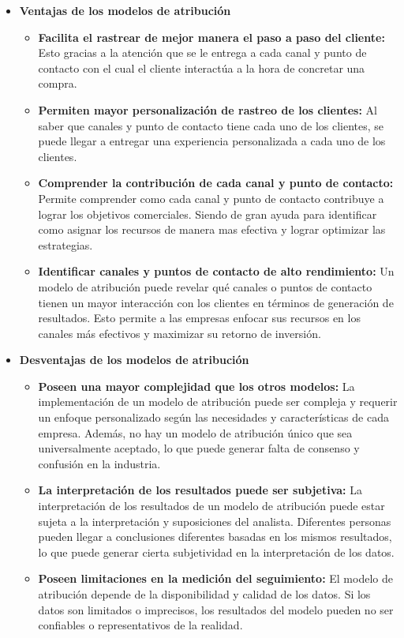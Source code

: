 \begin{itemize}
    \item \textbf{Ventajas de los modelos de atribución}
    \begin{itemize}
        \item \textbf{Facilita el rastrear de mejor manera el paso a paso del cliente:} Esto gracias a la atención que se le entrega a cada canal y punto de contacto con el cual el cliente interactúa a la hora de concretar una compra.
        \item \textbf{Permiten mayor personalización de rastreo de los clientes:} Al saber que canales y punto de contacto tiene cada uno de los clientes, se puede llegar a entregar una experiencia personalizada a cada uno de los clientes.
        \item \textbf{Comprender la contribución de cada canal y punto de contacto:} Permite comprender como cada canal y punto de contacto contribuye a lograr los objetivos comerciales. Siendo de gran ayuda para identificar como asignar los recursos de manera mas efectiva y lograr optimizar las estrategias.
        \item \textbf{Identificar canales y puntos de contacto de alto rendimiento:} Un modelo de atribución puede revelar qué canales o puntos de contacto tienen un mayor interacción con los clientes en términos de generación de resultados. Esto permite a las empresas enfocar sus recursos en los canales más efectivos y maximizar su retorno de inversión.
    \end{itemize}
    \item \textbf{Desventajas de los modelos de atribución}
    \begin{itemize}
    \item \textbf{Poseen una mayor complejidad que los otros modelos:} La implementación de un modelo de atribución puede ser compleja y requerir un enfoque personalizado según las necesidades y características de cada empresa. Además, no hay un modelo de atribución único que sea universalmente aceptado, lo que puede generar falta de consenso y confusión en la industria.
    \item \textbf{La interpretación de los resultados puede ser subjetiva:} La interpretación de los resultados de un modelo de atribución puede estar sujeta a la interpretación y suposiciones del analista. Diferentes personas pueden llegar a conclusiones diferentes basadas en los mismos resultados, lo que puede generar cierta subjetividad en la interpretación de los datos.
    \item \textbf{Poseen limitaciones en la medición del seguimiento:} El modelo de atribución depende de la disponibilidad y calidad de los datos. Si los datos son limitados o imprecisos, los resultados del modelo pueden no ser confiables o representativos de la realidad.
    \end{itemize}
\end{itemize}